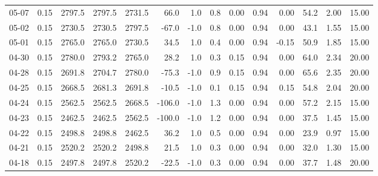 \begin{threeparttable}
{\begin{tabular}{lrrrrrrrrrrrrr}
  05-07 &     0.15 & 2797.5 & 2797.5 & 2731.5 &       66.0 &                      1.0 &                 0.8 &       0.00 &      0.94 &           0.00 &             54.2 &            2.00 &                  15.00 \\
  05-02 &     0.15 & 2730.5 & 2730.5 & 2797.5 &      -67.0 &                     -1.0 &                 0.8 &       0.00 &      0.94 &           0.00 &             43.1 &            1.55 &                  15.00 \\
  05-01 &     0.15 & 2765.0 & 2765.0 & 2730.5 &       34.5 &                      1.0 &                 0.4 &       0.00 &      0.94 &          -0.15 &             50.9 &            1.85 &                  15.00 \\
  04-30 &     0.15 & 2780.0 & 2793.2 & 2765.0 &       28.2 &                      1.0 &                 0.3 &       0.15 &      0.94 &           0.00 &             64.0 &            2.34 &                  20.00 \\
  04-28 &     0.15 & 2691.8 & 2704.7 & 2780.0 &      -75.3 &                     -1.0 &                 0.9 &       0.15 &      0.94 &           0.00 &             65.6 &            2.35 &                  20.00 \\
  04-25 &     0.15 & 2668.5 & 2681.3 & 2691.8 &      -10.5 &                     -1.0 &                 0.1 &       0.15 &      0.94 &           0.15 &             54.8 &            2.04 &                  20.00 \\
  04-24 &     0.15 & 2562.5 & 2562.5 & 2668.5 &     -106.0 &                     -1.0 &                 1.3 &       0.00 &      0.94 &           0.00 &             57.2 &            2.15 &                  15.00 \\
  04-23 &     0.15 & 2462.5 & 2462.5 & 2562.5 &     -100.0 &                     -1.0 &                 1.2 &       0.00 &      0.94 &           0.00 &             37.5 &            1.45 &                  15.00 \\
  04-22 &     0.15 & 2498.8 & 2498.8 & 2462.5 &       36.2 &                      1.0 &                 0.5 &       0.00 &      0.94 &           0.00 &             23.9 &            0.97 &                  15.00 \\
  04-21 &     0.15 & 2520.2 & 2520.2 & 2498.8 &       21.5 &                      1.0 &                 0.3 &       0.00 &      0.94 &           0.00 &             32.0 &            1.30 &                  15.00 \\
  04-18 &     0.15 & 2497.8 & 2497.8 & 2520.2 &      -22.5 &                     -1.0 &                 0.3 &       0.00 &      0.94 &           0.00 &             37.7 &            1.48 &                  20.00 \\

\end{tabular}}
\end{threeparttable}
